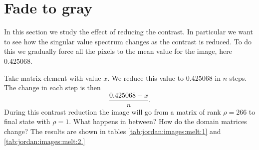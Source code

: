 
\break
\clearpage

\section{Fade to gray}
In this section we study the effect of reducing the contrast. In particular we want to see how the singular value spectrum changes as the contrast is reduced. To do this we gradually force all the pixels to the mean value for the image, here 0.425068. 

Take matrix element with value $x$. We reduce this value to 0.425068 in $n$ steps. The change in each step is then
\begin{equation}
  \frac{0.425068 - x}{n}.
\end{equation}
During this contrast reduction the image will go from a matrix of rank $\rho = 266$ to final state with $\rho = 1$. What happens in between? How do the domain matrices change? The results are shown in tables \eqref{tab:jordan:images:melt:1} and  \eqref{tab:jordan:images:melt:2.}

\break
\clearpage

